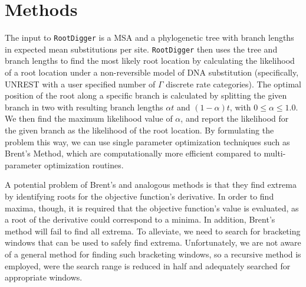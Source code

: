 \documentclass{article}
\newcommand{\RootDiggertt}{\texttt{RootDigger}}
\begin{document}
\section{Methods}

The input to \RootDiggertt{} is a MSA and a phylogenetic tree with branch
lengths in expected mean substitutions per site.  \RootDiggertt{} then uses the
tree and branch lengths to find the most likely root location by calculating the
likelihood of a root location under a non-reversible model of DNA substitution
(specifically, UNREST \cite{yang_estimating_1994} with a user specified number
of $\Gamma$ discrete rate categories).  The optimal position of the root along a
specific branch is calculated by splitting the given branch in two with
resulting branch lengths $\alpha t$ and $(1-\alpha) t$, with $0 \leq \alpha \leq
1.0$.  We then find the maximum likelihood value of $\alpha$, and report the
likelihood for the given branch as the likelihood of the root location.  By
formulating the problem this way, we can use single parameter optimization
techniques such as Brent's Method\footnotemark{}, which are computationally more
efficient compared to multi-parameter optimization routines.


A potential problem of Brent's and analogous methods is that they find extrema
by identifying roots for the objective function's derivative. In order to find
maxima, though, it is required that the objective function's value is evaluated,
as a root of the derivative could correspond to a minima. In addition, Brent's
method will fail to find all extrema. To alleviate, we need to search for
bracketing windows that can be used to safely find extrema.  Unfortunately, we
are not aware of a general method for finding such bracketing windows, so a
recursive method is employed, were the search range is reduced in half and
adequately searched for appropriate\footnotemark{} windows.

\end{document}
